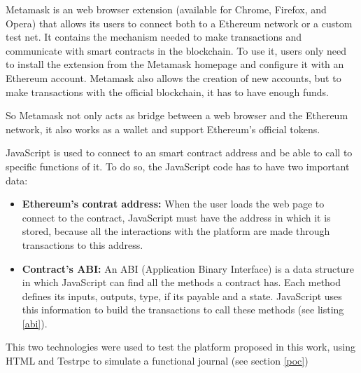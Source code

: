 Metamask is an web browser extension (available for Chrome, Firefox, and Opera)
that allows its users to connect both to a Ethereum network or a custom test
net. It contains the mechanism needed to make transactions and communicate with
smart contracts in the blockchain. To use it, users only need to install the
extension from the Metamask homepage and configure it with an Ethereum account.
Metamask also allows the creation of new accounts, but to make transactions with
the official blockchain, it has to have enough funds.

So Metamask not only acts as bridge between a web browser and the Ethereum
network, it also works as a wallet and support Ethereum's official tokens.

JavaScript is used to connect to an smart contract address and be able to call
to specific functions of it. To do so, the JavaScript code has to have two
important data:

\begin{itemize}
\item \textbf{Ethereum's contrat address:} When the user loads the web page to
  connect to the contract, JavaScript must have the address in which it is
  stored, because all the interactions with the platform are made through
  transactions to this address.
\item \textbf{Contract's ABI:} An ABI (Application Binary Interface) is a data
  structure in which JavaScript can find all the methods a contract has. Each
  method defines its inputs, outputs, type, if its payable and a state.
  JavaScript uses this information to build the transactions to call these
  methods (see listing \ref{abi}).

\end{itemize}

This two technologies were used to test the platform proposed in this work,
using HTML and Testrpc to simulate a functional journal (see section \ref{poc})




